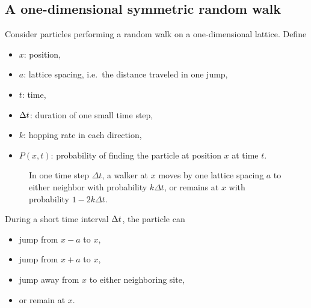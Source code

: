 
\subsection{A one-dimensional symmetric random walk}
\label{sec:random-walk}



Consider particles performing a random walk on a one-dimensional lattice.
Define
\begin{itemize}
    \item $x$: position,
    \item $a$: lattice spacing, i.e.\ the distance traveled in one jump,
    \item $t$: time,
    \item $\Delta t$: duration of one small time step,
    \item $k$: hopping rate in each direction,
    \item $P(x,t)$: probability of finding the particle at position $x$ at time $t$.
\end{itemize}

\begin{figure}[H]
    \centering
    \caption{In one time step $\Delta t$, a walker at $x$ moves by one lattice spacing $a$ to either neighbor with probability $k\Delta t$, or remains at $x$ with probability $1-2k\Delta t$.}
    \label{fig:one-dimensional-walk}
\end{figure}

During a short time interval $\Delta t$, the particle can
\begin{itemize}
    \item jump from $x-a$ to $x$,
    \item jump from $x+a$ to $x$,
    \item jump away from $x$ to either neighboring site,
    \item or remain at $x$.
\end{itemize}

